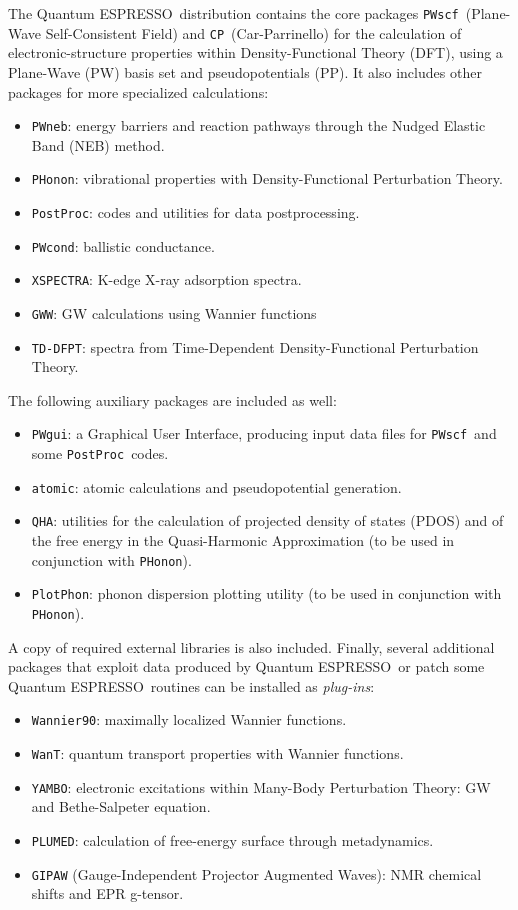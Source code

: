\documentclass[12pt,a4paper]{article}
\def\qe{{\sc Quantum ESPRESSO}}
\def\PWscf{\texttt{PWscf}}
\def\PHonon{\texttt{PHonon}}
\def\CP{\texttt{CP}}
\def\PostProc{\texttt{PostProc}}
\def\NEB{\texttt{PWneb}} %
\begin{document}
The \qe\ distribution contains the core packages \PWscf\ (Plane-Wave 
Self-Consistent Field) and \CP\ (Car-Parrinello) for the calculation
of electronic-structure properties within
Density-Functional Theory (DFT), using a Plane-Wave (PW) basis set 
and pseudopotentials (PP). It also includes other packages for
more specialized calculations:
\begin{itemize}
  \item \NEB:
        energy barriers and reaction pathways through the Nudged Elastic Band 
        (NEB) method.
  \item \PHonon:
        vibrational properties  with Density-Functional Perturbation Theory.
  \item \PostProc: 
        codes and utilities for data postprocessing.
  \item \texttt{PWcond}: 
        ballistic conductance.
  \item \texttt{XSPECTRA}:
        K-edge X-ray adsorption spectra.
  \item \texttt{GWW}:
        GW calculations using Wannier functions
  \item \texttt{TD-DFPT}:
        spectra from Time-Dependent 
        Density-Functional Perturbation Theory.
\end{itemize}
The following auxiliary packages are included as well:
\begin{itemize}
\item \texttt{PWgui}:
      a Graphical User Interface, producing input data files for 
      \PWscf\ and some \PostProc\ codes.
\item \texttt{atomic}:
      atomic calculations and pseudopotential generation.
\item \texttt{QHA}:
      utilities for the calculation of projected density of states (PDOS)
      and of the free energy in the Quasi-Harmonic Approximation (to be
      used in conjunction with \PHonon).
\item \texttt{PlotPhon}:
      phonon dispersion plotting utility (to be
      used in conjunction with \PHonon).
\end{itemize}
A copy of required external libraries is also included.
Finally, several additional packages that exploit data produced by \qe\ 
or patch some \qe\ routines can be installed as {\em plug-ins}:
\begin{itemize}
\item \texttt{Wannier90}:
      maximally localized Wannier functions.
\item \texttt{WanT}:
      quantum transport properties with Wannier functions.
\item \texttt{YAMBO}:
      electronic excitations within Many-Body Perturbation Theory:
      GW and Bethe-Salpeter equation.
\item \texttt{PLUMED}:
      calculation of free-energy surface through metadynamics.
\item \texttt{GIPAW} (Gauge-Independent Projector Augmented Waves):
      NMR chemical shifts and EPR g-tensor.
\end{itemize}
\end{document}
